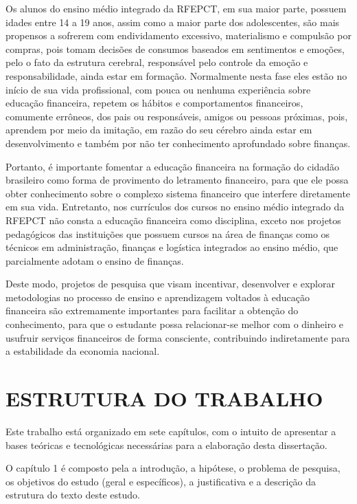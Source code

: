 Os alunos do ensino médio integrado da RFEPCT, em sua maior parte, possuem idades entre 14 a 19 anos, assim como a maior parte dos adolescentes, são mais propensos a sofrerem com endividamento excessivo, materialismo e compulsão por compras, pois tomam decisões de consumos baseados em sentimentos e emoções, pelo o fato da estrutura cerebral, responsável pelo controle da emoção e responsabilidade, ainda estar em formação. Normalmente nesta fase eles estão no início de sua vida profissional, com pouca ou nenhuma experiência sobre educação financeira, repetem os hábitos e comportamentos financeiros, comumente errôneos, dos pais ou responsáveis, amigos ou pessoas próximas, pois, aprendem por meio da imitação, em razão do seu cérebro ainda estar em desenvolvimento \cite{herculano2005} e também por não ter conhecimento aprofundado sobre finanças.

Portanto, é importante fomentar a educação financeira na formação do cidadão brasileiro como forma de provimento do letramento financeiro, para que ele possa obter conhecimento sobre o complexo sistema financeiro que interfere diretamente em sua vida. Entretanto, nos currículos dos cursos no ensino médio integrado da RFEPCT não consta a educação financeira como disciplina, exceto nos projetos pedagógicos das instituições que possuem cursos na área de finanças como os técnicos em administração, finanças e logística integrados ao ensino médio, que parcialmente adotam o ensino de finanças.

Deste modo, projetos de pesquisa que visam incentivar, desenvolver e explorar metodologias no processo de ensino e aprendizagem voltados à educação financeira são extremamente importantes para facilitar a obtenção do conhecimento, para que o estudante possa relacionar-se melhor com o dinheiro e usufruir serviços financeiros de forma consciente, contribuindo indiretamente para a estabilidade da economia nacional.

\section{ESTRUTURA DO TRABALHO}
Este trabalho está organizado em sete capítulos, com o intuito de apresentar a bases teóricas e tecnológicas necessárias para a elaboração desta dissertação.

O capítulo 1 é composto pela a introdução, a hipótese, o problema de pesquisa, os objetivos do estudo (geral e específicos), a justificativa e a descrição da estrutura do texto deste estudo.

